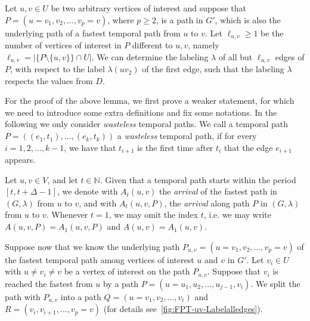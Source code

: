 \documentclass[a4paper,UKenglish,cleveref, autoref, thm-restate]{lipics-v2021}
\begin{document}
\begin{lemma}\label{lemma:FPT-uv-LabelAlmostalledges}
    Let $u, v \in U$ be two arbitrary vertices of interest and suppose that $P = (u=v_1, v_2, \dots, v_p = v)$, where $p \geq 2$, 
    is a path in $G'$, which is also the underlying path of a fastest temporal path from $u$ to $v$.
    Let $\ell_{u,v} \geq 1$ be the number of vertices of interest in $P$ different to $u,v$, namely $\ell_{u,v} = |\{P \setminus \{u,v \} \} \cap U |$.
    We can determine the labeling $\lambda$ of all but $\ell_{u,v}$ edges of $P$, with respect to the label $\lambda(uv_2)$ of the first edge,
    such that the labeling $\lambda$ respects the values from $D$.
\end{lemma}

For the proof of the above lemma, we first prove a weaker statement,
for which we need to introduce some extra definitions and fix some notations.
%
In the following
we only consider \emph{wasteless} temporal paths. 
We call 
a temporal path $P=((e_{1},t_{1}),\ldots ,(e_{k},t_{k}))$ a \emph{wasteless} temporal path, 
if for every $i=1,2,\ldots ,k-1$, we have that $t_{i+1}$ is the first time after $t_{i}$ that the edge $e_{i+1}$ appears. 

Let $u,v\in V$, and let $t\in \mathbb{N}$. 
Given that a temporal path starts within the period $[t,t+\Delta -1]$,
we denote with $A_{t}(u,v)$
the \emph{arrival} of the fastest path in $(G,\lambda )$ from $u$ to $v$, and
with $A_{t}(u,v,P)$,
the \emph{arrival} along path $P$ in $(G,\lambda )$ from $u$ to $v$.
%
Whenever $t=1$, we may omit the index $t$, i.e. we may write 
$A(u,v,P)=A_{1}(u,v,P)$ and $A(u,v)=A_{1}(u,v)$. 

Suppose now that 
we know the underlying path $P_{u,v} = (u=v_1, v_2, \dots, v_p = v)$ of the fastest temporal path among vertices of interest $u$ and $v$ in $G'$.
Let $v_i\in U$ with $u\neq v_i \neq v$ be a vertex of interest on the path $P_{u,v}$.
Suppose that $v_i$ is reached the fastest from $u$ by a path $P = (u = u_1, u_2, \dots, u_{j-1}, v_i)$.
We split the path with $P_{u,v}$ into a path $ Q = (u=v_1, v_2, \dots, v_i)$ and $R = (v_i, v_{i+1}, \dots, v_p=v)$
(for details see~\cref{fig:FPT-uv-Labelalledges}).
\end{document}

